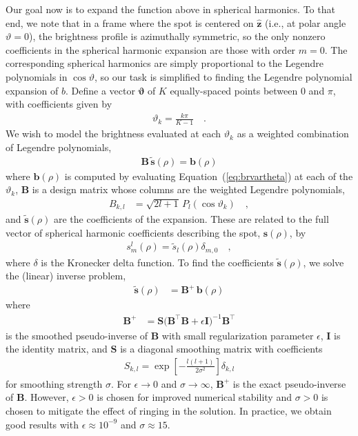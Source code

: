 \documentclass[modern]{aastex62}
\begin{document}
Our goal now is to expand the function above in spherical harmonics. To that end,
we note that in a frame where the spot is centered on $\hat{\mathbf{z}}$
(i.e., at polar angle $\vartheta = 0$), the brightness profile is azimuthally
symmetric, so the only nonzero coefficients in the spherical harmonic
expansion are those with order $m = 0$. The corresponding spherical harmonics are
simply proportional to the Legendre polynomials in $\cos\vartheta$, so our task is
simplified to finding the Legendre polynomial expansion of $b$.
Define a vector $\pmb{\vartheta}$ of $K$ equally-spaced points
between $0$ and $\pi$, with coefficients given by
%
\begin{align}
    \vartheta_k = \frac{k\pi}{K-1}
    \quad.
\end{align}
%
We wish to model the brightness evaluated at each $\vartheta_k$
as a weighted combination of Legendre polynomials,
%
\begin{align}
    \mathbf{B} \, \tilde{\mathbf{s}}(\rho) = \mathbf{b}(\rho)
\end{align}
%
%
where $\mathbf{b}(\rho)$ is computed by evaluating Equation~(\ref{eq:brvartheta})
at each of the $\vartheta_k$,
$\mathbf{B}$ is a design matrix whose columns are
the weighted Legendre polynomials,
%
\begin{align}
    B_{k,l} & = \sqrt{2l + 1} \, P_l\left( \cos \vartheta_k \right)
    \quad,
\end{align}
%
and $\tilde{\mathbf{s}}(\rho)$ are the coefficients of the expansion.
These are related to the full vector of spherical harmonic coefficients describing
the spot, $\mathbf{s}(\rho)$, by
%
\begin{align}
    s^l_m(\rho) = \tilde{s}_l(\rho) \delta_{m,0}
    \quad,
\end{align}
%
where $\delta$ is the Kronecker delta function.
To find the coefficients $\tilde{\mathbf{s}}(\rho)$, we solve the (linear) inverse problem,
%
\begin{align}
    \tilde{\mathbf{s}}(\rho) & = \mathbf{B}^+ \, \mathbf{b}(\rho)
\end{align}
%
%
where
%
\begin{align}
    \mathbf{B}^+ & = \mathbf{S} \Big(\mathbf{B}^\top \mathbf{B} +
    \epsilon \mathbf{I}\Big)^{-1} \mathbf{B}^\top
\end{align}
%
is the smoothed pseudo-inverse of $\mathbf{B}$ with small regularization
parameter $\epsilon$, $\mathbf{I}$ is the identity matrix, and
$\mathbf{S}$ is a diagonal smoothing matrix with coefficients
%
\begin{align}
    S_{k,l} = \exp\left[-\frac{l(l + 1)}{2\sigma^2}\right] \delta_{k,l}
\end{align}
%
for smoothing strength $\sigma$. For $\epsilon \rightarrow 0$ and
$\sigma \rightarrow \infty$,
$\mathbf{B}^+$ is the exact pseudo-inverse of
$\mathbf{B}$. However,
$\epsilon > 0$ is chosen for improved numerical stability and
$\sigma > 0$ is chosen to mitigate the effect of ringing in the solution.
In practice, we obtain good results with $\epsilon \approx 10^{-9}$
and $\sigma \approx 15$.
\end{document}
